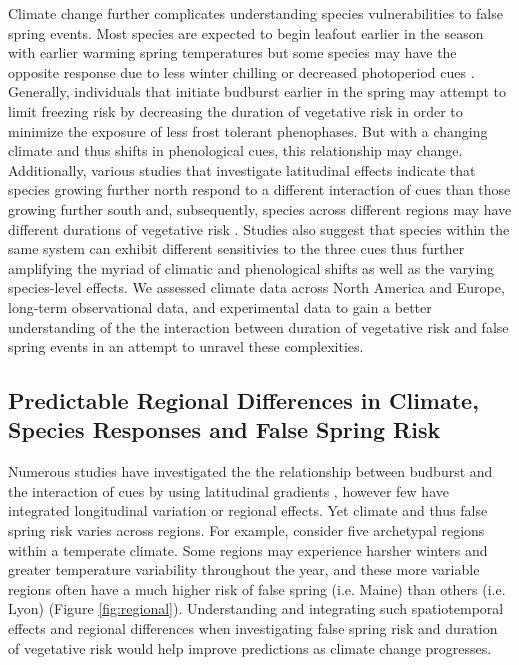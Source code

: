 \documentclass{article}\usepackage[]{graphicx}\usepackage[]{color}
\begin{document}
Climate change further complicates understanding species vulnerabilities to false spring events. Most species are expected to begin leafout earlier in the season with earlier warming spring temperatures but some species may have the opposite response due to less winter chilling or decreased photoperiod cues \citep{Cleland2006, Yu2010, Xin2016}. Generally, individuals that initiate budburst earlier in the spring may attempt to limit freezing risk by decreasing the duration of vegetative risk in order to minimize the exposure of less frost tolerant phenophases. But with a changing climate and thus shifts in phenological cues, this relationship may change. Additionally, various studies that investigate latitudinal effects indicate that species growing further north respond to a different interaction of cues than those growing further south and, subsequently, species across different regions may have different durations of vegetative risk \citep {Partanen2004, Viheraaarnio2006, Caffarra2011}. Studies also suggest that species within the same system can exhibit different sensitivies to the three cues \citep{Basler2012, Laube2013} thus further amplifying the myriad of climatic and phenological shifts as well as the varying species-level effects.  We assessed climate data across North America and Europe, long-term observational data, and experimental data to gain a better understanding of the the interaction between duration of vegetative risk and false spring events in an attempt to unravel these complexities.

\subsection {Predictable Regional Differences in Climate, Species Responses and False Spring Risk}
Numerous studies have investigated the the relationship between budburst and the interaction of cues by using latitudinal gradients \citep{Partanen2004, Viheraaarnio2006, Caffarra2011, Zohner2016, Gauzere2017}, however few have integrated longitudinal variation or regional effects. Yet climate and thus false spring risk varies across regions. For example, consider five archetypal regions within a temperate climate. Some regions may experience harsher winters and greater temperature variability throughout the year, and these more variable regions often have a much higher risk of false spring (i.e. Maine) than others (i.e. Lyon) (Figure \ref{fig:regional}). Understanding and integrating such spatiotemporal effects and regional differences when investigating false spring risk and duration of vegetative risk would help improve predictions as climate change progresses.
\end{document}
